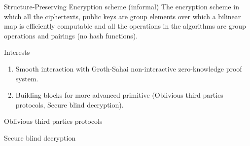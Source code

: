 \begin{frame}
  \begin{block}{Structure-Preserving Encryption scheme (informal)}
    The encryption scheme in which all the ciphertexts, public keys are group elements over which a bilinear map is efficiently computable and all the operations in the algorithms are group operations and pairings (\eg no hash functions).
  \end{block}

  \pause
  
  \begin{block}{Interests}
    \begin{enumerate}
    \item Smooth interaction with Groth-Sahai non-interactive zero-knowledge proof system.
    \item Building blocks for more advanced primitive (\eg Oblivious third parties protocols, Secure blind decryption). 
    \end{enumerate}

  \end{block}
\end{frame}



\begin{frame}{Oblivious third parties protocols~\cite{DBLP:conf/dim/CamenischGH08}}

\end{frame}

\begin{frame}{Secure blind decryption~\cite{DBLP:conf/pkc/Green11}}

\end{frame}

